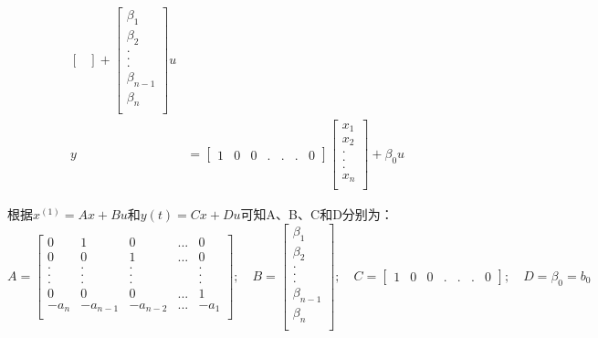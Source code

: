 \documentclass{article}
\numberwithin{equation}{section}
\numberwithin{figure}{section}
\begin{document}
\begin{equation}
\begin{split}
\begin{bmatrix}
        \end{bmatrix}
        +
        \begin{bmatrix}
            \beta_1\\
            \beta_2\\
            .\\
            .\\
            .\\
            \beta_{n-1}\\
            \beta_n\\
        \end{bmatrix}
        u\\
        y&=    
        \begin{bmatrix}
            1&0&0&.&.&.&0
        \end{bmatrix}
        \begin{bmatrix}
            x_1\\
            x_2\\
            .\\
            .\\
            .\\
            x_n\\
        \end{bmatrix}
        +
        \beta_0u
    \end{split}
\end{equation}

根据$x^{(1)}=Ax+Bu$和$y(t)=Cx+Du$可知A、B、C和D分别为：
\begin{equation}
    A=
    \begin{bmatrix}
        0&1&0&...&0\\
        0&0&1&...&0\\
        .&.&.& &.\\
        .&.&.& &.\\
        .&.&.& &.\\
        0&0&0&...&1\\
        -a_n&-a_{n-1}&-a_{n-2}&...&-a_1\\
    \end{bmatrix};
    \quad
    B=
    \begin{bmatrix}
        \beta_1\\
        \beta_2\\
        .\\
        .\\
        .\\
        \beta_{n-1}\\
        \beta_n\\
    \end{bmatrix};
    \quad
    C=
    \begin{bmatrix}
        1&0&0&.&.&.&0
    \end{bmatrix};
    \quad
    D=\beta_0=b_0
\end{equation}
\end{document}
